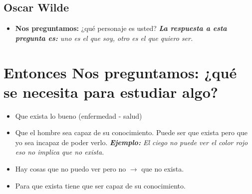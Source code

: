 \subsection{Oscar Wilde}
\begin{itemize}
    \item \textbf{Nos preguntamos:} ¿qué personaje es usted? \emph{\textbf{La respuesta a esta pregunta es: }uno es el que soy, otro es el que quiero ser.}
\end{itemize}

\section{Entonces \textbf{Nos preguntamos:} ¿qué se necesita para estudiar algo?}
\begin{itemize}
    \item Que exista lo bueno (enfermedad - salud)
    \item Que el hombre sea capaz de su conocimiento. Puede ser que exista pero que yo sea incapaz de poder verlo. \emph{\textbf{Ejemplo: }El ciego no puede ver el color rojo eso no implica que no exista.}
    \item Hay cosas que no puedo ver pero no $\rightarrow$ que no exista.
    \item Para que exista tiene que ser capaz de su conocimiento.
\end{itemize}
